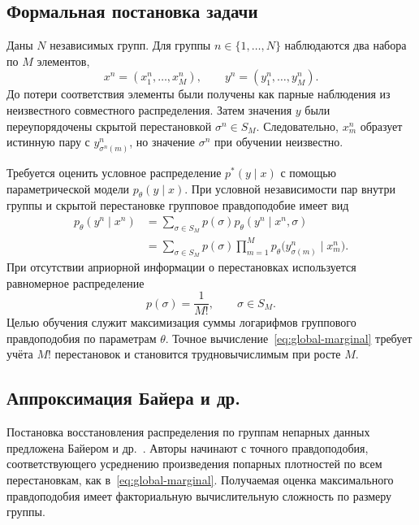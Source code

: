 \subsection{Формальная постановка задачи}

Даны $N$ независимых групп. Для группы $n\in\{1,\dots,N\}$ наблюдаются два набора по $M$
элементов,
\begin{equation}
x^n=(x^n_1,\dots,x^n_M), \qquad
y^n=(y^n_1,\dots,y^n_M).
\end{equation}
До потери соответствия элементы были получены как парные наблюдения из неизвестного
совместного распределения. Затем значения $y$ были переупорядочены скрытой перестановкой
$\sigma^n\in S_M$. Следовательно, $x^n_m$ образует истинную пару с
$y^n_{\sigma^n(m)}$, но значение $\sigma^n$ при обучении неизвестно.

Требуется оценить условное распределение $p^*(y\mid x)$ с помощью параметрической модели
$p_\theta(y\mid x)$. При условной независимости пар внутри группы и скрытой перестановке
групповое правдоподобие имеет вид
\begin{align}
p_\theta(y^n\mid x^n)
&=\sum_{\sigma\in S_M}p(\sigma)
  p_\theta(y^n\mid x^n,\sigma) \nonumber\\
&=\sum_{\sigma\in S_M}p(\sigma)
  \prod_{m=1}^{M}p_\theta\bigl(y^n_{\sigma(m)}\mid x^n_m\bigr).
\label{eq:global-marginal}
\end{align}
При отсутствии априорной информации о перестановках используется равномерное распределение
\begin{equation}
p(\sigma)=\frac{1}{M!}, \qquad \sigma\in S_M.
\end{equation}
Целью обучения служит максимизация суммы логарифмов группового правдоподобия по параметрам
$\theta$. Точное вычисление~\eqref{eq:global-marginal} требует учёта $M!$ перестановок и
становится трудновычислимым при росте $M$.

\subsection{Аппроксимация Байера и др.}

Постановка восстановления распределения по группам непарных данных предложена Байером и
др.~\cite{beier2024transfer}. Авторы начинают с точного правдоподобия, соответствующего
усреднению произведения попарных плотностей по всем перестановкам, как
в~\eqref{eq:global-marginal}. Получаемая оценка максимального правдоподобия имеет
факториальную вычислительную сложность по размеру группы.

